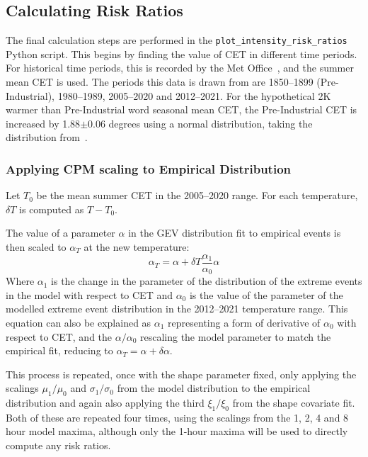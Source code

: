 \subsection{Calculating Risk Ratios}\label{subsec:riskratios}

The final calculation steps are performed in the \texttt{plot\_intensity\_risk\_ratios}~\cite{Me_Code} Python script.
This begins by finding the value of CET in different time periods.
For historical time periods,
    this is recorded by the Met Office~\cite{CET},
    and the summer mean CET is used.
The periods this data is drawn from are 1850--1899 (Pre-Industrial),
    1980--1989, 2005--2020 and 2012--2021.
For the hypothetical 2K warmer than Pre-Industrial word seasonal mean CET,
    the Pre-Industrial CET is increased by 1.88$\pm$0.06 degrees using a normal distribution,
    taking the distribution from~\cite{Tett_Soon}.

\subsubsection{Applying CPM scaling to Empirical Distribution}

Let $T_0$ be the mean summer CET in the 2005--2020 range.
For each temperature, $\delta T$ is computed as $T - T_0$.

The value of a parameter $\alpha$ in the GEV distribution fit to empirical events is then scaled to $\alpha_T$ at the new temperature:
\begin{equation}\label{eq:newradarparams}
    \alpha_T = \alpha + \delta T \frac{\alpha_1}{\alpha_0} \alpha
\end{equation}
Where $\alpha_1$ is the change in the parameter of the distribution of the extreme events in the model with respect to CET and
    $\alpha_0$ is the value of the parameter of the modelled extreme event distribution in the 2012--2021 temperature range.
This equation can also be explained as $\alpha_1$ representing a form of derivative of $\alpha_0$ with respect to CET,
    and the $\alpha / \alpha_0$ rescaling the model parameter to match the empirical fit, reducing to
    $\alpha_T = \alpha + \delta \alpha$.

This process is repeated, once with the shape parameter fixed, only applying the scalings $\mu_1 / \mu_0$ and $\sigma_1 / \sigma_0$
    from the model distribution to the empirical distribution and again also applying the third $\xi_1 / \xi_0$ from the shape covariate fit.
Both of these are repeated four times, using the scalings from the 1, 2, 4 and 8 hour model maxima,
    although only the 1-hour maxima will be used to directly compute any risk ratios.

